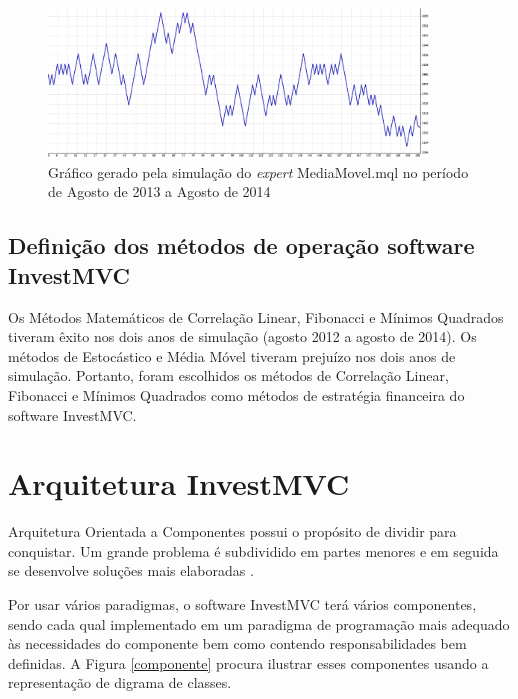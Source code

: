 \begin{figure}[H]
\centering
\includegraphics[width=0.9\textwidth]{figuras/protocoloMedia4}
\caption{ Gráfico gerado pela simulação do \textit{expert} MediaMovel.mql no período de Agosto de 2013 a Agosto de 2014} 
\label{protocoloMedia4}
\end{figure}


\subsection{Definição dos métodos de operação software InvestMVC}

Os Métodos Matemáticos de Correlação Linear, Fibonacci e Mínimos Quadrados tiveram êxito nos dois anos de simulação (agosto 2012 a agosto de 2014). Os métodos de Estocástico e Média Móvel tiveram prejuízo nos dois anos de simulação. Portanto, foram escolhidos os métodos de Correlação Linear, Fibonacci e Mínimos Quadrados como métodos de estratégia financeira do software InvestMVC.

\section{Arquitetura InvestMVC}

Arquitetura Orientada a Componentes possui o propósito de dividir para conquistar. Um grande problema é subdividido em partes menores e em seguida se desenvolve soluções mais elaboradas \cite{john}.

Por usar vários paradigmas, o software InvestMVC terá vários componentes, sendo cada qual implementado em um paradigma de programação mais adequado às necessidades do componente bem como contendo responsabilidades bem definidas. A Figura \ref{componente} procura ilustrar esses componentes usando a representação de digrama de classes.

